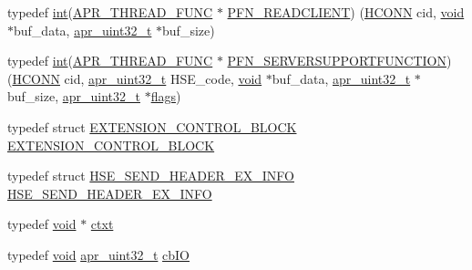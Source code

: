 \begin{DoxyCompactItemize}
\item 
typedef \hyperlink{pcre_8txt_a42dfa4ff673c82d8efe7144098fbc198}{int}(\hyperlink{group__apr__platform_gade8f829f9bd98fd4386894acf72edd7c}{A\+P\+R\+\_\+\+T\+H\+R\+E\+A\+D\+\_\+\+F\+U\+NC} $\ast$ \hyperlink{group__MOD__ISAPI_ga82b868f4281793cc507027a7251b3ae9}{P\+F\+N\+\_\+\+R\+E\+A\+D\+C\+L\+I\+E\+NT}) (\hyperlink{group__MOD__ISAPI_ga3fd355d88d70287fd8783d066d69214e}{H\+C\+O\+NN} cid, \hyperlink{group__MOD__ISAPI_gacd6cdbf73df3d9eed42fa493d9b621a6}{void} $\ast$buf\+\_\+data, \hyperlink{group__apr__platform_ga558548a135d8a816c4787250744ea147}{apr\+\_\+uint32\+\_\+t} $\ast$buf\+\_\+size)
\item 
typedef \hyperlink{pcre_8txt_a42dfa4ff673c82d8efe7144098fbc198}{int}(\hyperlink{group__apr__platform_gade8f829f9bd98fd4386894acf72edd7c}{A\+P\+R\+\_\+\+T\+H\+R\+E\+A\+D\+\_\+\+F\+U\+NC} $\ast$ \hyperlink{group__MOD__ISAPI_ga0283669808e737dad3591ba97bb3f89d}{P\+F\+N\+\_\+\+S\+E\+R\+V\+E\+R\+S\+U\+P\+P\+O\+R\+T\+F\+U\+N\+C\+T\+I\+ON}) (\hyperlink{group__MOD__ISAPI_ga3fd355d88d70287fd8783d066d69214e}{H\+C\+O\+NN} cid, \hyperlink{group__apr__platform_ga558548a135d8a816c4787250744ea147}{apr\+\_\+uint32\+\_\+t} H\+S\+E\+\_\+code, \hyperlink{group__MOD__ISAPI_gacd6cdbf73df3d9eed42fa493d9b621a6}{void} $\ast$buf\+\_\+data, \hyperlink{group__apr__platform_ga558548a135d8a816c4787250744ea147}{apr\+\_\+uint32\+\_\+t} $\ast$buf\+\_\+size, \hyperlink{group__apr__platform_ga558548a135d8a816c4787250744ea147}{apr\+\_\+uint32\+\_\+t} $\ast$\hyperlink{pcre_8txt_ad7a10cd81a384ff727296d05bb827806}{flags})
\item 
typedef struct \hyperlink{structEXTENSION__CONTROL__BLOCK}{E\+X\+T\+E\+N\+S\+I\+O\+N\+\_\+\+C\+O\+N\+T\+R\+O\+L\+\_\+\+B\+L\+O\+CK} \hyperlink{group__MOD__ISAPI_ga66e96c5723c4b8417c30fffa1d3211e8}{E\+X\+T\+E\+N\+S\+I\+O\+N\+\_\+\+C\+O\+N\+T\+R\+O\+L\+\_\+\+B\+L\+O\+CK}
\item 
typedef struct \hyperlink{structHSE__SEND__HEADER__EX__INFO}{H\+S\+E\+\_\+\+S\+E\+N\+D\+\_\+\+H\+E\+A\+D\+E\+R\+\_\+\+E\+X\+\_\+\+I\+N\+FO} \hyperlink{group__MOD__ISAPI_ga4bdbf3055f0003d1a08052398ab18768}{H\+S\+E\+\_\+\+S\+E\+N\+D\+\_\+\+H\+E\+A\+D\+E\+R\+\_\+\+E\+X\+\_\+\+I\+N\+FO}
\item 
typedef \hyperlink{group__MOD__ISAPI_gacd6cdbf73df3d9eed42fa493d9b621a6}{void} $\ast$ \hyperlink{group__MOD__ISAPI_ga79fe6db219ce5e6dc5f02c36ee429ae6}{ctxt}
\item 
typedef \hyperlink{group__MOD__ISAPI_gacd6cdbf73df3d9eed42fa493d9b621a6}{void} \hyperlink{group__apr__platform_ga558548a135d8a816c4787250744ea147}{apr\+\_\+uint32\+\_\+t} \hyperlink{group__MOD__ISAPI_gabbf0f8e6a7e82fb7b169e46a7317c3bb}{cb\+IO}

\end{DoxyCompactItemize}
